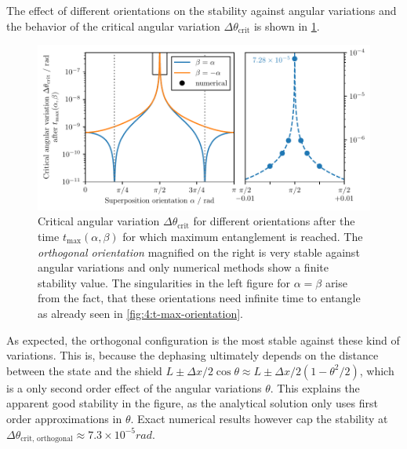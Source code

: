 The effect of different orientations on the stability against angular variations and the behavior of the critical angular variation $\Delta \theta_\mathrm{crit}$ is shown in \cref{fig:4:theta-crit-orientation}.
\begin{figure}[!htbp]
  \centering
  \includegraphics[width=\textwidth]{./../figures/theta-variance/theta-crit-orientation-complete.pdf}
  \caption{Critical angular variation $\Delta \theta_\mathrm{crit}$ for different orientations after the time $t_\mathrm{max}(\alpha, \beta)$ for which maximum entanglement is reached. The \emph{orthogonal orientation} magnified on the right is very stable against angular variations and only numerical methods show a finite stability value. The singularities in the left figure for $\alpha = \beta$ arise from the fact, that these orientations need infinite time to entangle as already seen in \cref{fig:4:t-max-orientation}.}
  \label{fig:4:theta-crit-orientation}
\end{figure}
As expected, the orthogonal configuration is the most stable against these kind of variations. This is, because the dephasing ultimately depends on the distance between the state and the shield $L \pm \Delta x/2 \cos\theta \approx L \pm \Delta x/2 (1 - \theta^2/2)$, which is a only second order effect of the angular variations $\theta$.
This explains the apparent  good stability in the figure, as the analytical solution only uses first order approximations in $\theta$.
Exact numerical results however cap the stability at $\Delta \theta_\mathrm{crit,\,orthogonal} \approx 7.3\times 10^{-5}\si{rad}$.

